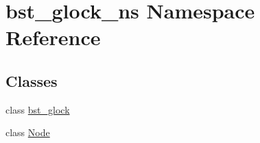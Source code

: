 \hypertarget{namespacebst__glock__ns}{}\section{bst\+\_\+glock\+\_\+ns Namespace Reference}
\label{namespacebst__glock__ns}
\subsection*{Classes}
\begin{DoxyCompactItemize}
\item 
class \hyperlink{classbst__glock__ns_1_1bst__glock}{bst\+\_\+glock}
\item 
class \hyperlink{classbst__glock__ns_1_1Node}{Node}
\end{DoxyCompactItemize}
